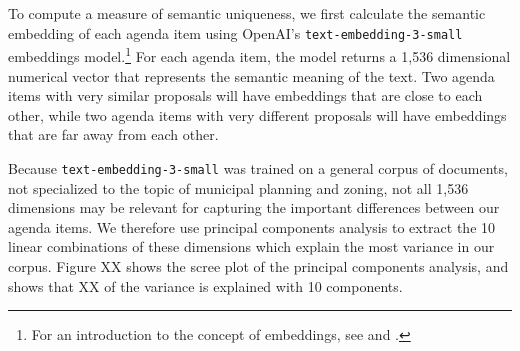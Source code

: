 To compute a measure of semantic uniqueness, we first calculate the semantic embedding of each agenda item using OpenAI's \texttt{text-embedding-3-small} embeddings model.\footnote{For an introduction to the concept of embeddings, see \citet{mikolov2013} and \citet{le2014}.} For each agenda item, the model returns a 1,536 dimensional numerical vector that represents the semantic meaning of the text. Two agenda items with very similar proposals will have embeddings that are close to each other, while two agenda items with very different proposals will have embeddings that are far away from each other. 

Because \texttt{text-embedding-3-small} was trained on a general corpus of documents, not specialized to the topic of municipal planning and zoning, not all 1,536 dimensions may be relevant for capturing the important differences between our agenda items. We therefore use principal components analysis to extract the 10 linear combinations of these dimensions which explain the most variance in our corpus. Figure XX shows the scree plot of the principal components analysis, and shows that XX of the variance is explained with 10 components.





